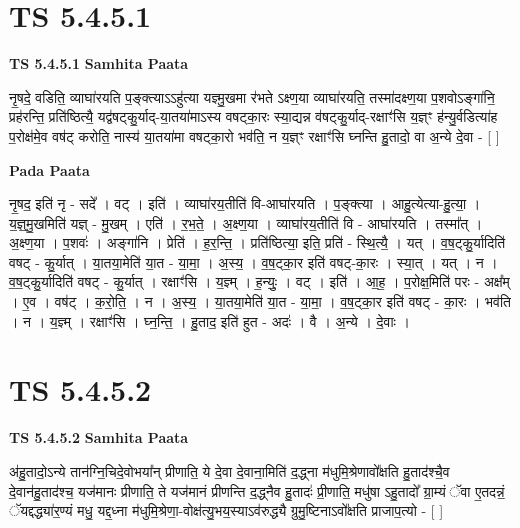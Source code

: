 \documentclass[17pt]{extarticle}
\begin{document}
\section*{ TS 5.4.5.1 }

\textbf{TS 5.4.5.1 } \newline
\textbf{Samhita Paata} \newline

नृ॒षदे॒ वडिति॒ व्याघा॑रयति प॒ङ्क्त्याऽऽहु॑त्या यज्ञ्मु॒खमा र॑भते ऽक्ष्ण॒या व्याघा॑रयति॒ तस्मा॑दक्ष्ण॒या प॒शवोऽङ्गा॑नि॒ प्रह॑रन्ति॒ प्रति॑ष्ठित्यै॒ यद्व॑षट्कु॒र्याद्-या॒तया॑माऽस्य वषट्का॒रः स्या॒द्यन्न व॑षट्कु॒र्याद्-रक्षाꣳ॑सि य॒ज्ञ्ꣳ ह॑न्यु॒र्वडित्या॑ह प॒रोक्ष॑मे॒व वष॑ट् करोति॒ नास्य॑ या॒तया॑मा वषट्का॒रो भव॑ति॒ न य॒ज्ञ्ꣳ रक्षाꣳ॑सि घ्नन्ति हु॒तादो॒ वा अ॒न्ये दे॒वा - [  ] \newline

\textbf{Pada Paata} \newline

नृ॒षद॒ इति॑ नृ - सदे᳚ । वट् । इति॑ । व्याघा॑रय॒तीति॑ वि-आघा॑रयति । प॒ङ्क्त्या । आहु॒त्येत्या-हु॒त्या॒ । य॒ज्ञ्॒मु॒खमिति॑ यज्ञ् - मु॒खम् । एति॑ । र॒भ॒ते॒ । अ॒क्ष्ण॒या । व्याघा॑रय॒तीति॑ वि - आघा॑रयति । तस्मा᳚त् । अ॒क्ष्ण॒या । प॒शवः॑ । अङ्गा॑नि । प्रेति॑ । ह॒र॒न्ति॒ । प्रति॑ष्ठित्या॒ इति॒ प्रति॑ - स्थि॒त्यै॒ । यत् । व॒ष॒ट्कु॒र्यादिति॑ वषट् - कु॒र्यात् । या॒तया॒मेति॑ या॒त - या॒मा॒ । अ॒स्य॒ । व॒ष॒ट्का॒र इति॑ वषट्-का॒रः । स्या॒त् । यत् । न । व॒ष॒ट्कु॒र्यादिति॑ वषट् - कु॒र्यात् । रक्षाꣳ॑सि । य॒ज्ञ्म् । ह॒न्युः॒ । वट् । इति॑ । आ॒ह॒ । प॒रोक्ष॒मिति॑ परः - अक्ष᳚म् । ए॒व । वष॑ट् । क॒रो॒ति॒ । न । अ॒स्य॒ । या॒तया॒मेति॑ या॒त - या॒मा॒ । व॒ष॒ट्का॒र इति॑ वषट् - का॒रः । भव॑ति । न । य॒ज्ञ्म् । रक्षाꣳ॑सि । घ्न॒न्ति॒ । हु॒ताद॒ इति॑ हुत - अदः॑ । वै । अ॒न्ये । दे॒वाः ।  \newline




\section*{ TS 5.4.5.2 }

\textbf{TS 5.4.5.2 } \newline
\textbf{Samhita Paata} \newline

अ॑हु॒तादो॒ऽन्ये तान॑ग्नि॒चिदे॒वोभया᳚न् प्रीणाति॒ ये दे॒वा दे॒वाना॒मिति॑ द॒द्ध्ना म॑धुमि॒श्रेणावो᳚क्षति हु॒ताद॑श्चै॒व दे॒वान॑हु॒ताद॑श्च॒ यज॑मानः प्रीणाति॒ ते यज॑मानं प्रीणन्ति द॒द्ध्नैव हु॒तादः॑ प्री॒णाति॒ मधु॑षा ऽहु॒तादो᳚ ग्रा॒म्यं ॅवा ए॒तदन्नं॒ ॅयद्दद्ध्या॑र॒ण्यं मधु॒ यद्द॒ध्ना म॑धुमि॒श्रेणा॒-वोक्ष॑त्यु॒भय॒स्याऽव॑रुद्ध्यै ग्रुमु॒ष्टिनाऽवो᳚क्षति प्राजाप॒त्यो - [  ] \newline
\end{document}
